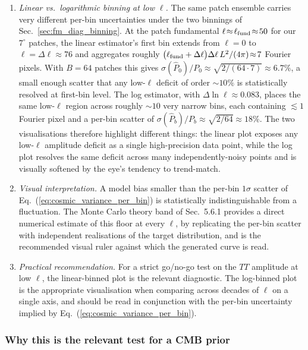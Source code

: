 \documentclass[11pt]{article}
\theoremstyle{definition}
\begin{document}
\begin{enumerate}[leftmargin=2.0em,itemsep=0.15em]
  \item \emph{Linear vs.\ logarithmic binning at low $\ell$.} The same patch ensemble carries very different per-bin uncertainties under the two binnings of Sec.~\ref{sec:fm_diag_binning}. At the patch fundamental $\ell\!\approx\!\ell_{\rm fund}\!\approx\!50$ for our $7^\circ$ patches, the linear estimator's first bin extends from $\ell=0$ to $\ell=\Delta\ell\!\approx\!76$ and aggregates roughly $\bigl(\ell_{\rm fund}+\Delta\ell\bigr)\Delta\ell\,L^2/(4\pi)\!\approx\!7$ Fourier pixels. With $B=64$ patches this gives $\sigma(\hat P_0)/P_0 \approx \sqrt{2/(64\cdot 7)}\approx 6.7\%$, a small enough scatter that any low-$\ell$ deficit of order $\sim\!10\%$ is statistically resolved at first-bin level. The log estimator, with $\Delta\ln\ell\approx 0.083$, places the same low-$\ell$ region across roughly $\sim\!10$ very narrow bins, each containing $\lesssim\!1$ Fourier pixel and a per-bin scatter of $\sigma(\hat P_b)/P_b\approx \sqrt{2/64}\approx 18\%$. The two visualisations therefore highlight different things: the linear plot exposes any low-$\ell$ amplitude deficit as a single high-precision data point, while the log plot resolves the same deficit across many independently-noisy points and is visually softened by the eye's tendency to trend-match.
  \item \emph{Visual interpretation.} A model bias smaller than the per-bin $1\sigma$ scatter of Eq.~(\ref{eq:cosmic_variance_per_bin}) is statistically indistinguishable from a fluctuation. The Monte Carlo theory band of Sec.~5.6.1 provides a direct numerical estimate of this floor at every $\ell$, by replicating the per-bin scatter with independent realisations of the target distribution, and is the recommended visual ruler against which the generated curve is read.
  \item \emph{Practical recommendation.} For a strict go/no-go test on the $TT$ amplitude at low $\ell$, the linear-binned plot is the relevant diagnostic. The log-binned plot is the appropriate visualisation when comparing across decades of $\ell$ on a single axis, and should be read in conjunction with the per-bin uncertainty implied by Eq.~(\ref{eq:cosmic_variance_per_bin}).
\end{enumerate}

\subsubsection{Why this is the relevant test for a CMB prior}
\end{document}
